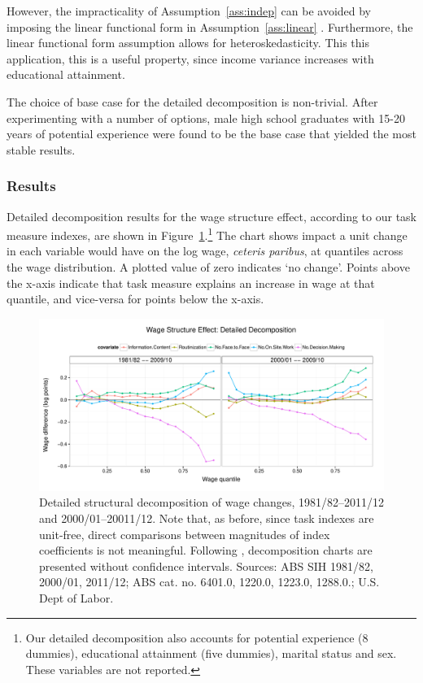 However, the impracticality of Assumption~\ref{ass:indep} can be avoided by imposing the linear functional form in Assumption~\ref{ass:linear} \citep[p.28]{Fortin2011}. Furthermore, the linear functional form assumption allows for heteroskedasticity. This this application, this is a useful property, since income variance increases with educational attainment.

The choice of base case for the detailed decomposition is non-trivial. After experimenting with a number of options, male high school graduates with 15-20 years of potential experience were found to be the base case that yielded the most stable results.

\subsubsection{Results}

Detailed decomposition results for the wage structure effect, according to our task measure indexes, are shown in Figure~\ref{fig:structure}.\footnote{Our detailed decomposition also accounts for potential experience (8 dummies), educational attainment (five dummies), marital status and sex. These variables are not reported.} The chart shows impact a unit change in each variable would have on the log wage, {\em ceteris paribus}, at quantiles across the wage distribution. A plotted value of zero indicates `no change'. Points above the x-axis indicate that task measure explains an increase in wage at that quantile, and vice-versa for points below the x-axis.

\begin{figure}[th]
  \centering
  \includegraphics[width=\textwidth]{../figure/structure_decomp.pdf}
  \caption{Detailed structural decomposition of wage changes, 1981/82--2011/12 and 2000/01--20011/12. Note that, as before, since task indexes are unit-free, direct comparisons between magnitudes of index coefficients is not meaningful. Following \citet{Firpo2011}, decomposition charts are presented without confidence intervals. Sources: ABS SIH 1981/82, 2000/01, 2011/12; ABS cat. no. 6401.0, 1220.0, 1223.0, 1288.0.; U.S. Dept of Labor.}
  \label{fig:structure}
\end{figure}


